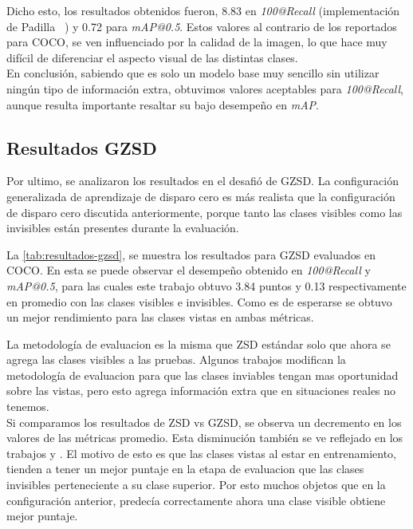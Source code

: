 Dicho esto, los resultados obtenidos fueron, 8.83 en \textit{100@Recall} (implementación de Padilla \etal~\cite{padilla2020survey}) y 0.72 para \textit{mAP@0.5}. Estos valores al contrario de los reportados para COCO, se ven influenciado por la calidad de la imagen, lo que hace muy difícil de diferenciar el aspecto visual de las distintas clases.\\

En conclusión, sabiendo que es solo un modelo base muy sencillo sin utilizar ningún tipo de información extra, obtuvimos valores aceptables para \textit{100@Recall}, aunque resulta importante resaltar su bajo desempeño en \textit{mAP}. 

\subsection{Resultados GZSD}
Por ultimo, se analizaron los resultados en el desafió de GZSD. La configuración generalizada de aprendizaje de disparo cero es más realista que la configuración de disparo cero discutida anteriormente, porque tanto las clases visibles como las invisibles están presentes durante la evaluación.

La \autoref{tab:resultados-gzsd}, se muestra los resultados para GZSD evaluados en COCO. En esta se puede observar el desempeño obtenido en \textit{100@Recall} y \textit{mAP@0.5}, para las cuales este trabajo obtuvo 3.84 puntos y 0.13 respectivamente en promedio con las clases visibles e invisibles. Como es de esperarse se obtuvo un mejor rendimiento para las clases vistas en ambas métricas.

La metodología de evaluacion es la misma que ZSD estándar solo que ahora se agrega las clases visibles a las pruebas. Algunos trabajos modifican la metodología de evaluacion para que las clases inviables tengan mas oportunidad sobre las vistas, pero esto agrega información extra que en situaciones reales no tenemos.\\

Si comparamos los resultados de ZSD vs GZSD, se observa un decremento en los valores de las métricas promedio. Esta disminución también se ve reflejado en los trabajos \cite{bansal2018zero} y \cite{rahman2020zero}. El motivo de esto es que las clases vistas al estar en entrenamiento, tienden a tener un mejor puntaje en la etapa de evaluacion que las clases invisibles perteneciente a su clase superior. Por esto muchos objetos que en la configuración anterior, predecía correctamente ahora una clase visible obtiene mejor puntaje.\\



